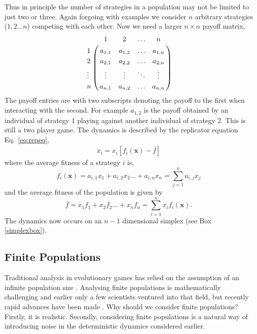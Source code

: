 \documentclass[oneside,11pt,a4paper]{book}
\begin{document}
Thus in principle the number of strategies in a population may not be limited to just two or three.
Again forgoing with examples we consider $n$ arbitrary strategies ($1,2 \ldots n$) competing with each other.
Now we need a larger $n \times n$ payoff matrix,
%
\begin{eqnarray}
\label{eq:paymat}
\bordermatrix{
&1&2&\hdots&n\cr
1&a_{1,1} & a_{1,2}&\hdots& a_{1,n}\cr
2&a_{2,1} & a_{2,2}&\hdots& a_{2,n}\cr
\vdots&\vdots & \vdots&\ddots&\vdots\cr
n&a_{n,1} & a_{n,2}&\hdots& a_{n,n}\cr
}
\end{eqnarray}
%
The payoff entries are with two subscripts denoting the payoff to the first when interacting with the second.
For example $a_{1,2}$ is the payoff obtained by an individual of strategy $1$ playing against another individual of strategy $2$.
This is still a two player game. 
The dynamics is described by the replicator equation Eq.\ \eqref{eq:repeq},
%
\begin{eqnarray}
\dot{x}_i = x_i \left[f_i (\mathbf{x}) - \bar{f} \right] \nonumber
\end{eqnarray}
%
where the average fitness of a strategy $i$ is, 
%
\begin{equation}
f_i(\mathbf{x}) = a_{i,1} x_1 +a_{i,2} x_2 \ldots +a_{i,n} x_n = \sum_{j=1}^n a_{i,j} x_j \nonumber
\end{equation}
%
and the average fitness of the population is given by 
%
\begin{equation}
\bar{f} = x_1 f_1 +x_2 f_2 \ldots +x_n f_n = \sum_{i=1}^{n} x_i f_i (\mathbf{x}). \nonumber
\end{equation}
%
The dynamics now occurs on an $n-1$ dimensional simplex (see Box \ref{simplexbox}).
\\

\subsection{Finite Populations}

Traditional analysis in evolutionary games has relied on the assumption of an infinite population size \citep{maynard-smith:1973to,taylor:1978wv,maynard-smith:1982to,hofbauer:1998mm,hofbauer:2003mm}.
Analysing finite populations is mathematically challenging and earlier only a few scientists ventured into that field, but recently rapid advances have been made \citep{riley:1979aa,schaffer:1988le,fogel:1998aa,ficci:2000aa,schreiber:2001aa,nowak:2004aa,nowak:2004pw,taylor:2004wv,wild:2004aa,traulsen:2005hp,traulsen:2006hp,antal:2006aa,fudenberg:2006fu,traulsen:2007bb,wild:2007aa,hauert:2008bb,antal:2009hc,hashimoto:2009,altrock:2009aa,altrock:2010aa,gokhale:2010pn}.
Why should we consider finite populations?
Firstly, it is realistic.
Secondly, considering finite populations is a natural way of introducing noise in the deterministic dynamics considered earlier.
\end{document}
